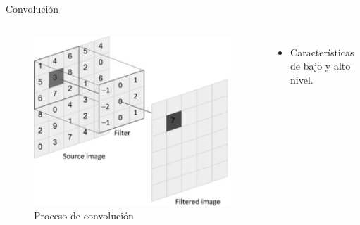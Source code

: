\documentclass[12pt,aspectratio=169]{beamer}
\begin{document}
\begin{frame}{Convolución}

    \begin{columns}[c] 
            \begin{figure}
                \includegraphics[scale=0.4]{figs/conv_2d.jpg}
                \caption{Proceso de convolución}
            \end{figure}
            \begin{itemize}
                \item Características de bajo y alto nivel.
                \vspace{4mm}
                

\end{itemize}
\end{columns}
\end{frame}
\end{document}
